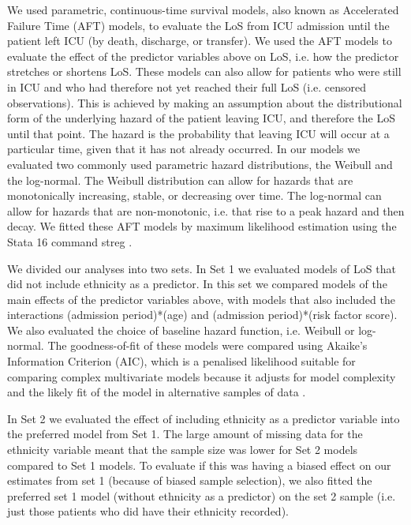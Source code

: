 \documentclass[review]{elsarticle}
\begin{document}
We used parametric, continuous-time survival models, also known as Accelerated Failure Time (AFT) models, to evaluate the LoS from ICU admission until the patient left ICU (by death, discharge, or transfer). We used the AFT models to evaluate the effect of the predictor variables above on LoS, i.e. how the predictor stretches or shortens LoS. These models can also allow for patients who were still in ICU and who had therefore not yet reached their full LoS (i.e. censored observations). This is achieved by making an assumption about the distributional form of the underlying hazard of the patient leaving ICU, and therefore the LoS until that point. The hazard is the probability that leaving ICU will occur at a particular time, given that it has not already occurred. In our models we evaluated two commonly used parametric hazard distributions, the Weibull and the log-normal. The Weibull distribution can allow for hazards that are monotonically increasing, stable, or decreasing over time. The log-normal can allow for hazards that are non-monotonic, i.e. that rise to a peak hazard and then decay. We fitted these AFT models by maximum likelihood estimation using the Stata 16 command \textsf{streg} \citep{statacorp2018stata}.


We divided our analyses into two sets. In Set 1 we evaluated models of LoS that did not include ethnicity as a predictor. In this set we compared models of the main effects of the predictor variables above, with models that also included the interactions (admission period)*(age) and (admission period)*(risk factor score). We also evaluated the choice of baseline hazard function, i.e. Weibull or log-normal. The goodness-of-fit of these models were compared using Akaike’s Information Criterion (AIC), which is a penalised likelihood suitable for comparing complex multivariate models because it adjusts for model complexity and the likely fit of the model in alternative samples of data \citep{burnham2004multimodel}. 

In Set 2 we evaluated the effect of including ethnicity as a predictor variable into the preferred model from Set 1. The large amount of missing data for the ethnicity variable meant that the sample size was lower for Set 2 models compared to Set 1 models. To evaluate if this was having a biased effect on our estimates from set 1 (because of biased sample selection), we also fitted the preferred set 1 model (without ethnicity as a predictor) on the set 2 sample (i.e. just those patients who did have their ethnicity recorded).  
\end{document}
